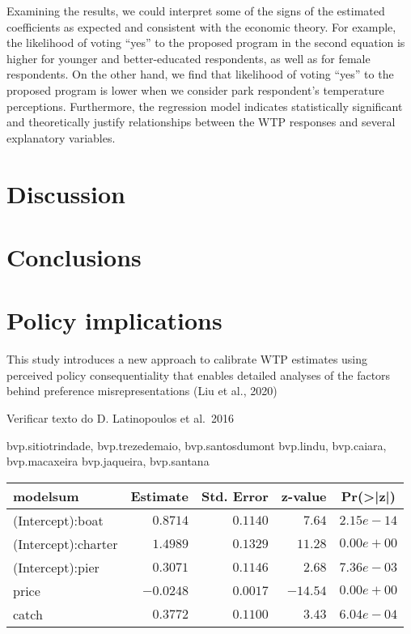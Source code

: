 \documentclass[
]{article}
\begin{document}
Examining the results, we could interpret some of the signs of the
estimated coefficients as expected and consistent with the economic
theory. For example, the likelihood of voting ``yes'' to the proposed
program in the second equation is higher for younger and better-educated
respondents, as well as for female respondents. On the other hand, we
find that likelihood of voting ``yes'' to the proposed program is lower
when we consider park respondent's temperature perceptions. Furthermore,
the regression model indicates statistically significant and
theoretically justify relationships between the WTP responses and
several explanatory variables.

\hypertarget{sec:4}{%
\section{Discussion}\label{sec:4}}

\hypertarget{sec:5}{%
\section{Conclusions}\label{sec:5}}

\hypertarget{policy-implications}{%
\section{Policy implications}\label{policy-implications}}

This study introduces a new approach to calibrate WTP estimates using
perceived policy consequentiality that enables detailed analyses of the
factors behind preference misrepresentations (Liu et al., 2020)

Verificar texto do D. Latinopoulos et al.~2016

bvp.sitiotrindade, bvp.trezedemaio, bvp.santosdumont bvp.lindu,
bvp.caiara, bvp.macaxeira bvp.jaqueira, bvp.santana

\begin{tabular}{lrrrr}
\hline\hline
\multicolumn{1}{l}{modelsum}&\multicolumn{1}{c}{Estimate}&\multicolumn{1}{c}{Std. Error}&\multicolumn{1}{c}{z-value}&\multicolumn{1}{c}{Pr(\textgreater |z|)}\tabularnewline
\hline
(Intercept):boat&$ 0.8714$&$0.1140$&$  7.64$&$2.15e-14$\tabularnewline
(Intercept):charter&$ 1.4989$&$0.1329$&$ 11.28$&$0.00e+00$\tabularnewline
(Intercept):pier&$ 0.3071$&$0.1146$&$  2.68$&$7.36e-03$\tabularnewline
price&$-0.0248$&$0.0017$&$-14.54$&$0.00e+00$\tabularnewline
catch&$ 0.3772$&$0.1100$&$  3.43$&$6.04e-04$\tabularnewline
\hline
\end{tabular}
\end{document}
